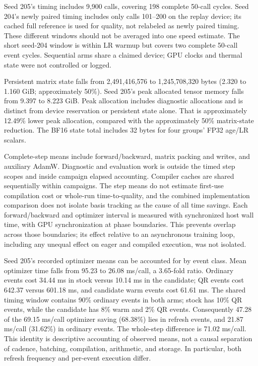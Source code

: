 Seed 205's timing includes 9,900 calls, covering 198 complete 50-call
cycles. Seed 204's newly paired timing includes only calls 101--200 on
the replay device; its cached full reference is used for quality, not
relabeled as newly paired timing. These different windows should not be
averaged into one speed estimate. The short seed-204 window is within LR
warmup but covers two complete 50-call event cycles. Sequential arms
share a claimed device; GPU clocks and thermal state were not controlled
or logged.

Persistent matrix state falls from 2,491,416,576 to 1,245,708,320 bytes
(2.320 to 1.160 GiB; approximately 50\%). Seed 205's peak allocated
tensor memory falls from 9.397 to 8.223 GiB. Peak allocation includes
diagnostic allocations and is distinct from device reservation or
persistent state alone. That is approximately 12.49\% lower peak
allocation, compared with the approximately 50\% matrix-state reduction.
The BF16 state total includes 32 bytes for four groups' FP32 age/LR
scalars.

Complete-step means include forward/backward, matrix packing and writes,
and auxiliary AdamW. Diagnostic and evaluation work is outside the timed
step scopes and inside campaign elapsed accounting. Compiler caches are
shared sequentially within campaigns. The step means do not estimate
first-use compilation cost or whole-run time-to-quality, and the
combined implementation comparison does not isolate basis tracking as the
cause of all time savings. Each forward/backward and optimizer interval
is measured with synchronized host wall time, with GPU synchronization
at phase boundaries. This prevents overlap across those boundaries; its
effect relative to an asynchronous training loop, including any unequal
effect on eager and compiled execution, was not isolated.

Seed 205's recorded optimizer means can be accounted for by event class.
Mean optimizer time falls from 95.23 to 26.08 ms/call, a 3.65-fold
ratio. Ordinary events cost 34.44 ms in stock versus 10.14 ms in the
candidate; QR events cost 642.37 versus 601.18 ms, and candidate warm
events cost 61.61 ms. The shared timing window contains 90\% ordinary
events in both arms; stock has 10\% QR events, while the candidate has
8\% warm and 2\% QR events. Consequently 47.28 of the 69.15 ms/call
optimizer saving (68.38\%) lies in refresh events, and 21.87 ms/call
(31.62\%) in ordinary events. The whole-step difference is 71.02
ms/call. This identity is descriptive accounting of observed means, not
a causal separation of cadence, batching, compilation, arithmetic, and
storage. In particular, both refresh frequency and per-event execution
differ.

